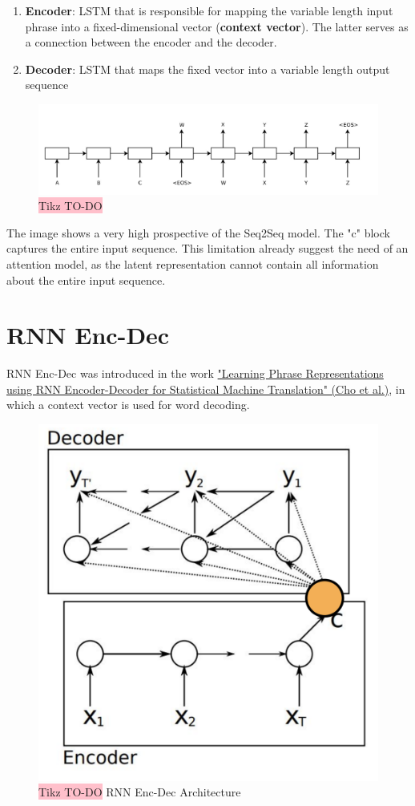 \begin{enumerate}
    \item \textbf{Encoder}: LSTM that is responsible for mapping the variable length input phrase into a fixed-dimensional vector (\textbf{context vector}). The latter serves as a connection between the encoder and the decoder.
    \item \textbf{Decoder}: LSTM that maps the fixed vector into a variable length output sequence
\end{enumerate}

\begin{figure}[!htbp]
    \centering
    \includegraphics[width=\linewidth]{tikz/chapter7 - Seq2Seq.png}
    \caption{{\color{red}\colorbox{pink}{Tikz TO-DO}}}
\end{figure}

The image shows a very high prospective of the Seq2Seq model. The "c" block captures the entire input sequence. This limitation already suggest the need of an attention model, as the latent representation cannot contain all information about the entire input sequence.

\section{RNN Enc-Dec}
RNN Enc-Dec was introduced in the work \href{https://arxiv.org/pdf/1409.3215}{"Learning Phrase Representations using RNN Encoder-Decoder for Statistical Machine Translation" (Cho et al.)}, in which a context vector is used for word decoding.

\begin{figure}[!htbp]
    \centering
    \includegraphics[width=0.45\linewidth]{tikz/chapter7 - RNN Enc-Dec.png}
    \caption{{\color{red}\colorbox{pink}{Tikz TO-DO}}  RNN Enc-Dec Architecture}
\end{figure}

